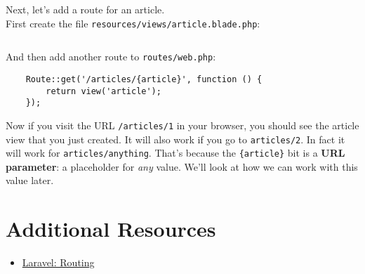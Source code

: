 Next, let's add a route for an article.
\\

First create the file \texttt{resources/views/article.blade.php}:

\inputminted{html}{07-routing/figures/02-article.html}

And then add another route to \texttt{routes/web.php}:

\begin{verbatim}
    Route::get('/articles/{article}', function () {
        return view('article');
    });
\end{verbatim}

Now if you visit the URL \texttt{/articles/1} in your browser, you should see the article view that you just created. It will also work if you go to \texttt{articles/2}. In fact it will work for \texttt{articles/anything}. That's because the \texttt{\{article\}} bit is a \textbf{URL parameter}: a placeholder for \textit{any} value. We'll look at how we can work with this value later.

\section{Additional Resources}

\begin{itemize}[leftmargin=*]
    \item \href{http://laravel.com/docs/master/routing}{Laravel: Routing}
\end{itemize}
